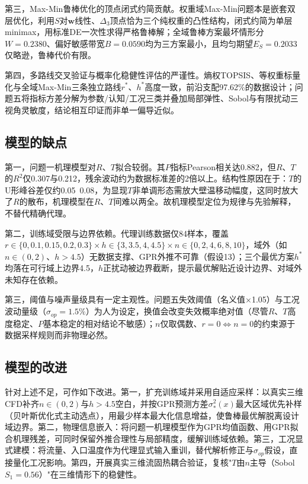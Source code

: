 \documentclass[withoutpreface]{cumcmthesis}
\begin{document}
第三，Max-Min鲁棒优化的顶点闭式约简贡献。权重域Max-Min问题本是嵌套双层优化，利用$S$对$\mathbf{w}$线性、$\Delta_3$顶点恰为三个纯权重的凸性结构，闭式约简为单层minimax，用标准DE一次性求得严格鲁棒解；全域鲁棒方案最坏情形分$W=0.2380$、偏好敏感带宽$B=0.0590$均为三方案最小，且均匀期望$E_S=0.2033$仅略逊，鲁棒代价有限。

第四，多路线交叉验证与概率化稳健性评估的严谨性。熵权TOPSIS、等权重标量化与全域Max-Min三条独立路线$r^*$、$h^*$高度一致，前沿支配97.62\%的数据设计；问题五将指标方差分解为参数/认知/工况三类并叠加局部弹性、Sobol与有限扰动三视角灵敏度，结论相互印证而非单一偏导近似。

\subsection{模型的缺点}
第一，问题一机理模型对$R$、$T$拟合较弱。其$P$指标Pearson相关达0.882，但$R$、$T$的$R^2$仅0.307与0.212，残余波动约为数据标准差的2倍以上。结构性原因在于：$T$的U形峰谷差仅约0.05~0.08，为显现$T$非单调形态需放大壁温移动幅度，这同时放大了$R$的散布，机理模型在$R$、$T$间难以两全。故机理模型定位为规律与先验解释，不替代精确代理。

第二，训练域受限与边界依赖。代理训练数据仅84样本，覆盖$r\in\{0,0.1,0.15,0.2,0.3\}\times h\in\{3,3.5,4,4.5\}\times n\in\{0,2,4,6,8,10\}$，域外（如$n\in(0,2)$、$h>4.5$）无数据支撑、GPR外推不可靠（假设13）；三个最优方案$h^*$均落在可行域上边界4.5，$h$正扰动被边界截断，提示最优解贴近设计边界、对域外未知存在依赖。

第三，阈值与噪声量级具有一定主观性。问题五失效阈值（名义值×1.05）与工况波动量级（$\sigma_{op}=1.5\%$）为人为设定，换值会改变失效概率绝对值（尽管$R$、$T$高度稳定、$P$基本稳定的相对结论不敏感）；$n$仅取偶数、$r=0\Longleftrightarrow n=0$的约束源于数据采样规则而非物理必然。

\subsection{模型的改进}
针对上述不足，可作如下改进。第一，扩充训练域并采用自适应采样：以真实三维CFD补齐$n\in(0,2)$与$h>4.5$空白，并按GPR预测方差$\sigma_*^2(x)$最大区域优先补样（贝叶斯优化式主动选点），用最少样本最大化信息增益，使鲁棒最优解脱离设计域边界。第二，物理信息嵌入：将问题一机理模型作为GPR均值函数、用GPR拟合机理残差，可同时保留外推合理性与局部精度，缓解训练域依赖。第三，工况显式建模：将流量、入口温度作为代理显式输入重训，替代解析修正与$\sigma_{op}$假设，直接量化工况影响。第四，开展真实三维流固热耦合验证，复核"$T$由$n$主导（Sobol $S_1=0.56$）"在三维情形下的稳健性。
\end{document}

